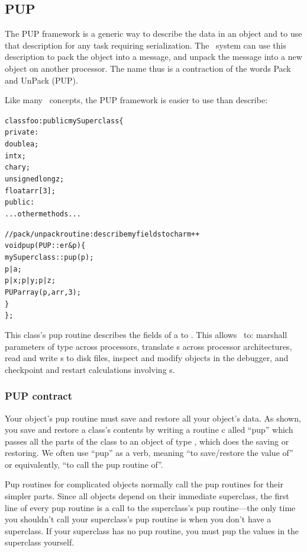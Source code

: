 \subsection{PUP}
\label{sec:pup}

The  PUP framework is a generic way to describe the data in an object and to use that description for any task requiring serialization.
The \charmpp\ system can use this description to pack the object 
into a message, and unpack the message into a new object on another 
processor. 
The name thus is a contraction of the words Pack and UnPack (PUP). 

Like many \CC\ concepts, the PUP framework is easier to use than 
describe: 

\begin{alltt}
class foo : public mySuperclass \{
 private:
    double a;
    int x;
    char y;
    unsigned long z;
    float arr[3];
 public:
    ...other methods...

    //pack/unpack routine: describe my fields to charm++
    void pup(PUP::er &p) \{
      mySuperclass::pup(p);
      p|a;
      p|x; p|y; p|z;
      PUParray(p,arr,3);
    \}
\};
\end{alltt}

This class's pup routine describes the fields of a  to \charmpp{}.
This allows \charmpp\ to: marshall parameters of type  across processors,
translate s across processor architectures, read and write s
to disk files, inspect and modify  objects in the debugger, and 
checkpoint and restart calculations involving s.



\subsubsection{PUP contract}

Your object's pup routine must save and restore all your object's data.
As shown, you save and restore a class's contents by writing a routine c
alled ``pup'' which passes all the parts of the class to an object of type 
 , which does the saving or restoring.  
We often use ``pup'' as a verb, meaning ``to save/restore the value of''
or equivalently, ``to call the pup routine of''.

Pup routines for complicated objects normally call the pup routines
for their simpler parts.  Since all objects depend on their immediate
superclass, the first line of every pup routine is a call to the 
superclass's pup routine---the only time you shouldn't call your superclass's
pup routine is when you don't have a superclass.  If your superclass has
no pup routine, you must pup the values in the superclass yourself.


